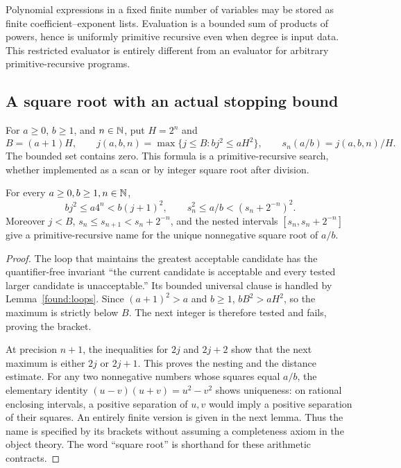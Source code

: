 Polynomial expressions in a fixed finite number of variables may be stored as finite coefficient--exponent lists. Evaluation is a bounded sum of products of powers, hence is uniformly primitive recursive even when degree is input data. This restricted evaluator is entirely different from an evaluator for arbitrary primitive-recursive programs.

\subsection{A square root with an actual stopping bound}

For $a\ge0$, $b\ge1$, and $n\in\mathbb N$, put $H=2^n$ and
\[
 B=(a+1)H,\qquad
 j(a,b,n)=\max\{j\le B:b j^2\le aH^2\},\qquad
 s_n(a/b)=j(a,b,n)/H.
\]
The bounded set contains zero. This formula is a primitive-recursive search, whether implemented as a scan or by integer square root after division.

\begin{theorem}\label{found:sqrt}
For every $a\ge0,b\ge1,n\in\mathbb N$,
\[
 b j^2\le a4^n<b(j+1)^2,
 \qquad s_n^2\le a/b<(s_n+2^{-n})^2.
\]
Moreover $j<B$, $s_n\le s_{n+1}<s_n+2^{-n}$, and the nested intervals
$[s_n,s_n+2^{-n}]$ give a primitive-recursive name for the unique nonnegative square root of $a/b$.
\end{theorem}
\begin{proof}
The loop that maintains the greatest acceptable candidate has the quantifier-free invariant ``the current candidate is acceptable and every tested larger candidate is unacceptable.'' Its bounded universal clause is handled by Lemma~\ref{found:loops}. Since $(a+1)^2>a$ and $b\ge1$, $bB^2>aH^2$, so the maximum is strictly below $B$. The next integer is therefore tested and fails, proving the bracket.

At precision $n+1$, the inequalities for $2j$ and $2j+2$ show that the next maximum is either $2j$ or $2j+1$. This proves the nesting and the distance estimate. For any two nonnegative numbers whose squares equal $a/b$, the elementary identity
$(u-v)(u+v)=u^2-v^2$ shows uniqueness: on rational enclosing intervals, a positive separation of $u,v$ would imply a positive separation of their squares. An entirely finite version is given in the next lemma. Thus the name is specified by its brackets without assuming a completeness axiom in the object theory. The word ``square root'' is shorthand for these arithmetic contracts.
\end{proof}

